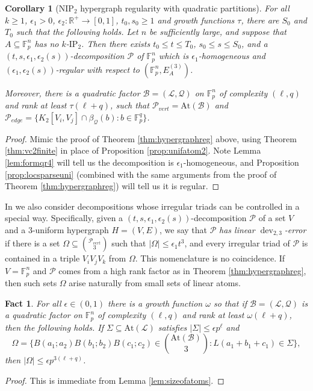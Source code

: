 \documentclass[12pt,oneside,british,a4wide]{amsart}
\newtheorem{corollary}[theorem]{Corollary}
\newtheorem{fact}[theorem]{Fact}
\numberwithin{equation}{section}
\theoremstyle{definition}
\def\F{\mathbb{F}}
\def\IP{\mathrm{IP}}
\def\NIP{\mathrm{NIP}}
\def\e{\epsilon}
\newcommand{\calL}{\mathcal{L}}
\newcommand{\calB}{\mathcal{B}}
\newcommand{\calP}{\mathcal{P}}
\newcommand{\calQ}{\mathcal{Q}}
\newcommand{\At}{{\mathrm{At}}}
\def\dev{\operatorname{dev}}
\begin{document}
\begin{corollary}[$\NIP_2$ hypergraph regularity with quadratic partitions]\label{cor:hypergraphvc2}
For all $k\geq 1$, $\e_1>0$, $\e_2:\mathbb{R}^+\rightarrow [0,1]$, $t_0,s_0\geq 1$ and growth functions $\tau$, there are $S_0$ and $T_0$ such that the following holds. Let $n$ be sufficiently large, and suppose that $A\subseteq \F_p^n$ has no $k$-$\IP_2$.   Then there exists $t_0\leq t\leq T_0$, $s_0\leq s\leq S_0$, and a $(t,s,\e_1,\e_2(s))$-decomposition $\calP$ of $\F_p^n$ which is $\e_1$-homogeneous and $(\e_1,\e_2(s))$-regular with respect to $(\F_p^n, E_A^{(3)})$.  

Moreover, there is a quadratic factor $\calB=(\calL,\calQ)$ on $\F_p^n$ of complexity $(\ell,q)$ and rank at least $\tau(\ell+q)$, such that $\calP_{vert}=\At(\calB)$ and $\calP_{edge}= \{K_2[V_i,V_j]\cap \beta_{\calQ}(b): b\in \F_p^{q}\}$. 
\end{corollary}
\begin{proof}
Mimic the proof of Theorem \ref{thm:hypergraphreg} above, using Theorem \ref{thm:vc2finite} in place of Proposition \ref{prop:unifatom2}.  Note  Lemma \ref{lem:formqr4} will tell us the decomposition is $\e_1$-homogeneous, and  Proposition \ref{prop:locsparseuni} (combined with the same arguments from the proof of Theorem \ref{thm:hypergraphreg}) will tell us it is regular.
\end{proof}

In \cite{Terry.2021b} we also consider decompositions whose irregular triads can be controlled in a special way.  Specifically, given a $(t,s,\e_1,\e_2(s))$-decomposition $\calP$ of a set $V$ and a $3$-uniform hypergraph $H=(V,E)$, we say that $\calP$ \emph{has linear $\dev_{2,3}$-error} if there is a set $\Omega\subseteq {\calP_{vert}\choose 3}$ such that $|\Omega|\leq \e_1 t^3$, and every irregular triad of $\calP$ is contained in a triple $V_iV_jV_k$ from $\Omega$.   This nomenclature is no coincidence. If $V=\F_p^n$ and $\calP$ comes from a high rank factor as in Theorem \ref{thm:hypergraphreg}, then such sets $\Omega$ arise naturally from small sets of linear atoms.

\begin{fact}
For all $\e\in (0,1)$ there is a growth function $\omega$ so that if $\calB=(\calL,\calQ)$ is a quadratic factor on $\F_p^n$ of complexity $(\ell,q)$ and rank at least $\omega(\ell+q)$, then the following holds.   If $\Sigma \subseteq \At(\calL)$ satisfies   $|\Sigma|\leq \e p^{\ell}$ and 
$$
\Omega=\{B(a_1;a_2)B(b_1;b_2)B(c_1;c_2)\in {\At(\calB)\choose 3}: L(a_1+b_1+c_1)\in \Sigma\},
$$
then $|\Omega|\leq \e p^{3(\ell+q)}$.
\end{fact}
\begin{proof}
This is immediate from Lemma \ref{lem:sizeofatoms}.
\end{proof}
\end{document}
